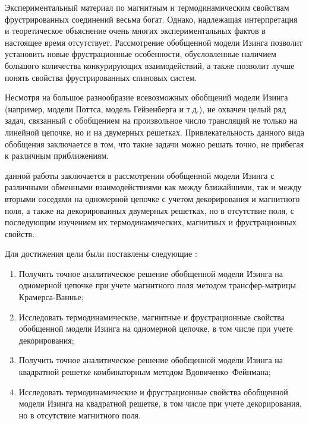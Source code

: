 {\actuality}\newline\indent
Экспериментальный материал по магнитным и термодинамическим свойствам фрустрированных соединений весьма богат. Однако, надлежащая интерпретация и теоретическое объяснение очень многих экспериментальных фактов в настоящее время отсутствует. Рассмотрение обобщенной модели Изинга позволит установить новые фрустрационные особенности, обусловленные наличием большого количества конкурирующих взаимодействий, а также позволит лучше понять свойства фрустрированных спиновых систем.

{\progress}\newline\indent
Несмотря на большое разнообразие всевозможных обобщений модели Изинга (например, модели Поттса, модель Гейзенберга и т.д.), не охвачен целый ряд задач, связанный с обобщением на произвольное число трансляций не только на линейной цепочке, но и на двумерных решетках. Привлекательность данного вида обобщения заключается в том, что такие задачи можно решать точно, не прибегая к различным приближениям.

{\aim} данной работы заключается в рассмотрении обобщенной модели Изинга с различными обменными взаимодействиями как между ближайшими, так и между вторыми соседями на одномерной цепочке с учетом декорирования и магнитного поля, а также на декорированных двумерных решетках, но в отсутствие поля, с последующим изучением их термодинамических, магнитных и фрустрационных свойств.

Для достижения цели были поставлены следующие {\tasks}:
\begin{enumerate}[beginpenalty=10000] %
  \item Получить точное аналитическое решение обобщенной модели Изинга на одномерной цепочке при учете магнитного поля методом трансфер-матрицы Крамерса-Ваннье;
  \item Исследовать термодинамические, магнитные и фрустрационные свойства обобщенной модели Изинга на одномерной цепочке, в том числе при учете декорирования; 
  \item Получить точное аналитическое решение обобщенной модели Изинга на квадратной решетке комбинаторным методом Вдовиченко--Фейнмана;
  \item Исследовать термодинамические и фрустрационные свойства обобщенной модели Изинга на квадратной решетке, в том числе при учете декорирования, но в отсутствие магнитного поля.
\end{enumerate}

